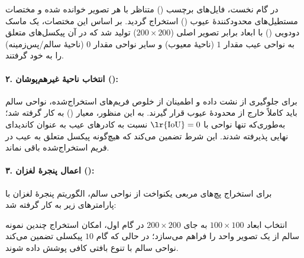 \documentclass[a4paper, 10pt, twocolumn]{article}
\begin{document}
	در گام نخست، فایل‌های برچسب () متناظر با هر تصویر خوانده شده و مختصات مستطیل‌های محدودکنندهٔ عیوب () استخراج گردید. بر اساس این مختصات، یک ماسک دودویی () با ابعاد برابر تصویر اصلی ($200 \times 200$) تولید شد که در آن پیکسل‌های متعلق به نواحی عیب مقدار $1$ (ناحیهٔ معیوب) و سایر نواحی مقدار $0$ (ناحیهٔ سالم/پس‌زمینه) را به خود گرفتند.
	
	\paragraph{۲. انتخاب ناحیهٔ غیرهم‌پوشان (): }
	
	برای جلوگیری از نشت داده و اطمینان از خلوص فریم‌های استخراج‌شده، نواحی سالم باید کاملاً خارج از محدودهٔ عیوب قرار گیرند. به این منظور، معیار  () به کار گرفته شد؛ به‌طوری‌که تنها نواحی با $\text{\lr{IoU}} = 0$ نسبت به کادرهای عیب به عنوان کاندیدای نهایی پذیرفته شدند. این شرط تضمین می‌کند که هیچ‌گونه پیکسل متعلق به عیب در فریم استخراج‌شده باقی نماند.
	
	\paragraph{۳. اعمال پنجرهٔ لغزان (): }
	
	برای استخراج پچ‌های مربعی یکنواخت از نواحی سالم، الگوریتم پنجرهٔ لغزان با پارامترهای زیر به کار گرفته شد:
	
\begin{table}[H]
	\centering
	\caption{پارامترهای عملیاتی الگوریتم پنجرهٔ لغزان}
	\label{tab:sliding-window-params}
\end{table}
	
	انتخاب ابعاد $100 \times 100$ به جای $200 \times 200$ در گام اول، امکان استخراج چندین نمونه سالم از یک تصویر واحد را فراهم می‌سازد؛ در حالی که گام $10$ پیکسلی تضمین می‌کند نواحی سالم با تنوع بافتی کافی پوشش داده شوند.
	
\end{document}
